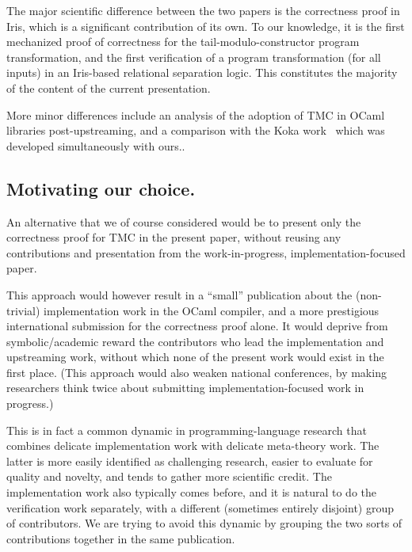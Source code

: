 The major scientific difference between the two papers is the
correctness proof in Iris, which is a significant contribution of its
own. To our knowledge, it is the first mechanized proof of correctness
for the tail-modulo-constructor program transformation, and the first
verification of a program transformation (for all inputs) in an
Iris-based relational separation logic. This constitutes the majority
of the content of the current presentation.

More minor differences include an analysis of the adoption of TMC in
OCaml libraries post-upstreaming, and a comparison with the Koka
work~\citep*{tmc-koka-2023} which was developed simultaneously with
ours..

\subsection{Motivating our choice.}

An alternative that we of course considered would be to present only
the correctness proof for TMC in the present paper, without reusing
any contributions and presentation from the work-in-progress,
implementation-focused paper.

This approach would however result in a ``small'' publication about
the (non-trivial) implementation work in the OCaml compiler, and
a more prestigious international submission for the correctness proof
alone. It would deprive from symbolic/academic reward the contributors
who lead the implementation and upstreaming work, without which none
of the present work would exist in the first place. (This approach
would also weaken national conferences, by making researchers think
twice about submitting implementation-focused work in progress.)

This is in fact a common dynamic in programming-language research that
combines delicate implementation work with delicate meta-theory
work. The latter is more easily identified as challenging research,
easier to evaluate for quality and novelty, and tends to gather more
scientific credit. The implementation work also typically comes
before, and it is natural to do the verification work separately, with
a different (sometimes entirely disjoint) group of contributors. We
are trying to avoid this dynamic by grouping the two sorts of
contributions together in the same publication.

